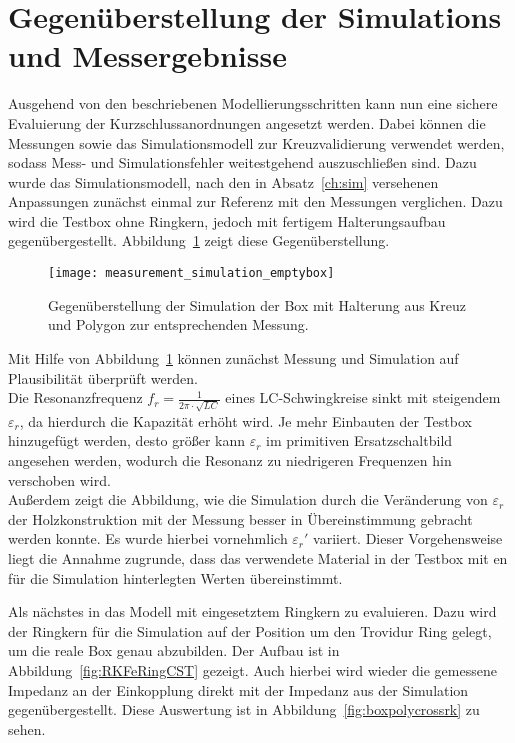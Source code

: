 \section{Gegen\"uberstellung der Simulations und Messergebnisse}\label{sec:gegenueberst}
Ausgehend von den beschriebenen Modellierungsschritten kann nun eine sichere Evaluierung der Kurzschlussanordnungen angesetzt werden. Dabei k\"onnen die Messungen sowie das Simulationsmodell zur Kreuzvalidierung verwendet werden, sodass Mess- und Simulationsfehler weitestgehend auszuschlie\ss{}en sind. Dazu wurde das Simulationsmodell, nach den in Absatz~\ref{ch:sim} versehenen Anpassungen zun\"achst einmal zur Referenz mit den Messungen verglichen. Dazu wird die Testbox ohne Ringkern, jedoch mit fertigem Halterungsaufbau gegen\"ubergestellt. Abbildung~\ref{fig:boxpolycross} zeigt diese Gegen\"uberstellung.

\begin{figure}[htb]
	\centering
	\texttt{[image: measurement\_simulation\_emptybox]}
	\caption{Gegen\"uberstellung der Simulation der Box mit Halterung aus Kreuz und Polygon zur entsprechenden Messung.}
	\label{fig:boxpolycross}
\end{figure}

Mit Hilfe von Abbildung~\ref{fig:boxpolycross} können zunächst Messung und Simulation auf Plausibilität überprüft werden.\\
Die Resonanzfrequenz $f_r = \frac{1}{2\pi \cdot \sqrt{LC}}$ eines LC-Schwingkreise sinkt mit steigendem $\varepsilon_r$, da hierdurch die Kapazität erhöht wird. Je mehr Einbauten der Testbox hinzugefügt werden, desto größer kann $\varepsilon_r$ im primitiven Ersatzschaltbild angesehen werden, wodurch die Resonanz zu niedrigeren Frequenzen hin verschoben wird.\\
Außerdem zeigt die Abbildung, wie die Simulation durch die Veränderung von $\varepsilon_r$ der Holzkonstruktion mit der Messung besser in Übereinstimmung gebracht werden konnte. Es wurde hierbei vornehmlich $\varepsilon_r'$ variiert. Dieser Vorgehensweise liegt die Annahme zugrunde, dass das verwendete Material in der Testbox mit en für die Simulation hinterlegten Werten übereinstimmt.
\par
Als n\"achstes in das Modell mit eingesetztem Ringkern zu evaluieren. Dazu wird der Ringkern f\"ur die Simulation auf der Position um den Trovidur Ring gelegt, um die reale Box genau abzubilden. Der Aufbau ist in Abbildung~\ref{fig:RKFeRingCST} gezeigt. Auch hierbei wird wieder die gemessene Impedanz an der Einkopplung direkt mit der Impedanz aus der Simulation gegen\"ubergestellt. Diese Auswertung ist in Abbildung~\ref{fig:boxpolycrossrk} zu sehen.



